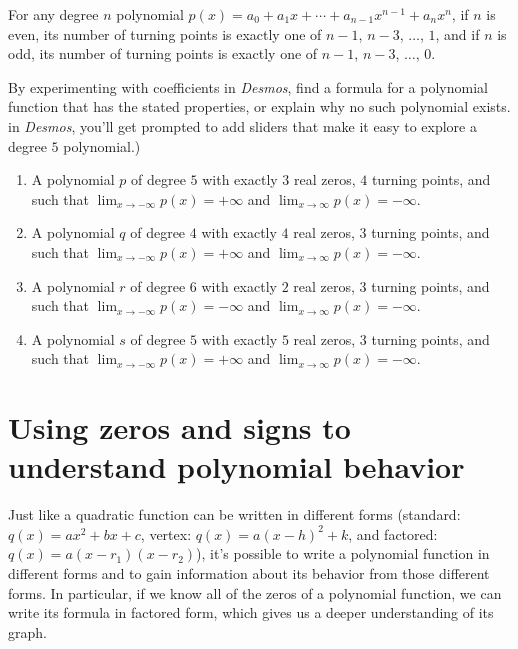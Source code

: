 \documentclass{ximera}
\begin{document}
For any degree $n$ polynomial $p(x) = a_0 + a_1 x + \cdots + a_{n-1}x^{n-1} + a_n x^n$, if $n$ is even, its number of turning points is exactly one of $n-1$, $n-3$, $\ldots$, $1$, and if $n$ is odd, its number of turning points is exactly one of $n-1$, $n-3$, $\ldots$, $0$.%



By experimenting with coefficients in \emph{Desmos}, find a formula for a polynomial function that has the stated properties, or explain why no such polynomial exists.   in \emph{Desmos}, you'll get prompted to add sliders that make it easy to explore a degree $5$ polynomial.)%
\begin{enumerate}[label=\alph*.]
\item A polynomial $p$ of degree $5$ with exactly $3$ real zeros, $4$ turning points, and such that $\lim_{x \to -\infty} p(x) = +\infty$ and $\lim_{x \to \infty} p(x) = -\infty$.%
\item A polynomial $q$ of degree $4$ with exactly $4$ real zeros, $3$ turning points, and such that $\lim_{x \to -\infty} p(x) = +\infty$ and $\lim_{x \to \infty} p(x) = -\infty$.%
\item A polynomial $r$ of degree $6$ with exactly $2$ real zeros, $3$ turning points, and such that $\lim_{x \to -\infty} p(x) = -\infty$ and $\lim_{x \to \infty} p(x) = -\infty$.%
\item A polynomial $s$ of degree $5$ with exactly $5$ real zeros, $3$ turning points, and such that $\lim_{x \to -\infty} p(x) = +\infty$ and $\lim_{x \to \infty} p(x) = -\infty$.%
\end{enumerate}
%

%
%
%
\section{Using zeros and signs to understand polynomial behavior}

Just like a quadratic function can be written in different forms (standard: $q(x) = ax^2 + bx + c$, vertex: $q(x) = a(x-h)^2 + k$, and factored: $q(x) = a(x-r_1)(x-r_2)$), it's possible to write a polynomial function in different forms and to gain information about its behavior from those different forms.  In particular, if we know all of the zeros of a polynomial function, we can write its formula in factored form, which gives us a deeper understanding of its graph.%
\end{document}
